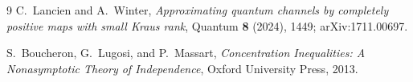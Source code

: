 \documentclass[11pt]{article}
\begin{document}
\begin{thebibliography}{9}
C.~Lancien and A.~Winter,
\emph{Approximating quantum channels by completely positive maps with small Kraus rank},
Quantum \textbf{8} (2024), 1449; arXiv:1711.00697.

S.~Boucheron, G.~Lugosi, and P.~Massart,
\emph{Concentration Inequalities: A Nonasymptotic Theory of Independence},
Oxford University Press, 2013.
\end{thebibliography}
\end{document}
